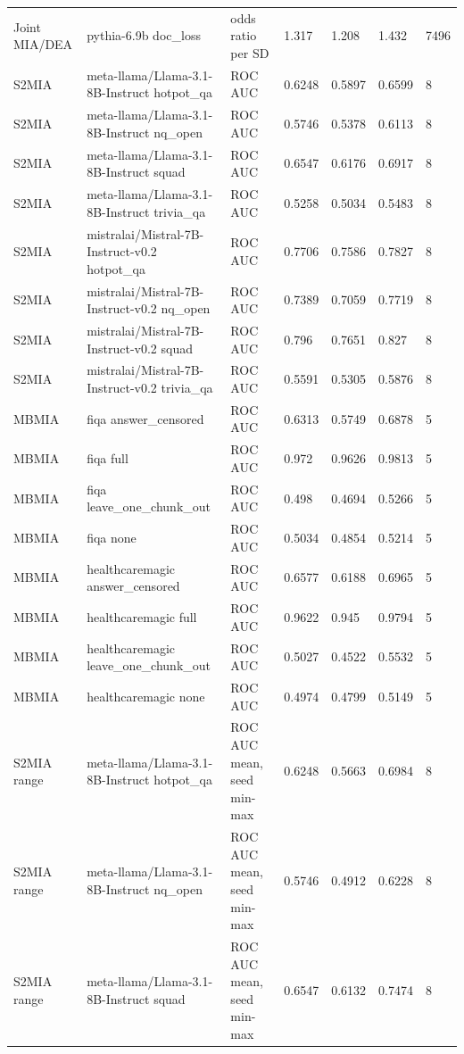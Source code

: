\begin{tabular}{lllllll}
Joint MIA/DEA & pythia-6.9b doc\_loss & odds ratio per SD & 1.317 & 1.208 & 1.432 & 7496 \\
S2MIA & meta-llama/Llama-3.1-8B-Instruct hotpot\_qa & ROC AUC & 0.6248 & 0.5897 & 0.6599 & 8 \\
S2MIA & meta-llama/Llama-3.1-8B-Instruct nq\_open & ROC AUC & 0.5746 & 0.5378 & 0.6113 & 8 \\
S2MIA & meta-llama/Llama-3.1-8B-Instruct squad & ROC AUC & 0.6547 & 0.6176 & 0.6917 & 8 \\
S2MIA & meta-llama/Llama-3.1-8B-Instruct trivia\_qa & ROC AUC & 0.5258 & 0.5034 & 0.5483 & 8 \\
S2MIA & mistralai/Mistral-7B-Instruct-v0.2 hotpot\_qa & ROC AUC & 0.7706 & 0.7586 & 0.7827 & 8 \\
S2MIA & mistralai/Mistral-7B-Instruct-v0.2 nq\_open & ROC AUC & 0.7389 & 0.7059 & 0.7719 & 8 \\
S2MIA & mistralai/Mistral-7B-Instruct-v0.2 squad & ROC AUC & 0.796 & 0.7651 & 0.827 & 8 \\
S2MIA & mistralai/Mistral-7B-Instruct-v0.2 trivia\_qa & ROC AUC & 0.5591 & 0.5305 & 0.5876 & 8 \\
MBMIA & fiqa answer\_censored & ROC AUC & 0.6313 & 0.5749 & 0.6878 & 5 \\
MBMIA & fiqa full & ROC AUC & 0.972 & 0.9626 & 0.9813 & 5 \\
MBMIA & fiqa leave\_one\_chunk\_out & ROC AUC & 0.498 & 0.4694 & 0.5266 & 5 \\
MBMIA & fiqa none & ROC AUC & 0.5034 & 0.4854 & 0.5214 & 5 \\
MBMIA & healthcaremagic answer\_censored & ROC AUC & 0.6577 & 0.6188 & 0.6965 & 5 \\
MBMIA & healthcaremagic full & ROC AUC & 0.9622 & 0.945 & 0.9794 & 5 \\
MBMIA & healthcaremagic leave\_one\_chunk\_out & ROC AUC & 0.5027 & 0.4522 & 0.5532 & 5 \\
MBMIA & healthcaremagic none & ROC AUC & 0.4974 & 0.4799 & 0.5149 & 5 \\
S2MIA range & meta-llama/Llama-3.1-8B-Instruct hotpot\_qa & ROC AUC mean, seed min-max & 0.6248 & 0.5663 & 0.6984 & 8 \\
S2MIA range & meta-llama/Llama-3.1-8B-Instruct nq\_open & ROC AUC mean, seed min-max & 0.5746 & 0.4912 & 0.6228 & 8 \\
S2MIA range & meta-llama/Llama-3.1-8B-Instruct squad & ROC AUC mean, seed min-max & 0.6547 & 0.6132 & 0.7474 & 8 \\

\end{tabular}

